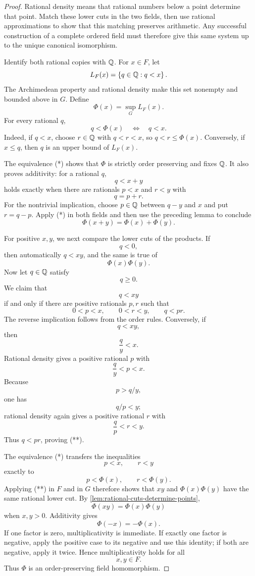 \begin{proof}
Rational density means that rational numbers below a point
determine that point. Match these lower cuts in the two fields, then use
rational approximations to show that this matching preserves arithmetic.
Any successful construction of a complete ordered field must therefore give
this same system up to the unique canonical isomorphism.

Identify both rational copies with \(\mathbb{Q}\).  For \(x\in F\), let
\[
L_F(x)=\left\{q\in\mathbb{Q}:q<x\right\}.
\]
The Archimedean property and rational density make this set nonempty and
bounded above in \(G\).  Define
\[
\Phi(x)=\sup_G L_F(x).
\]
For every rational \(q\),
\[
q<\Phi(x)\quad\Longleftrightarrow\quad q<x.
\tag{*}
\]
Indeed, if \(q<x\), choose \(r\in\mathbb{Q}\) with \(q<r<x\), so
\(q<r\leq\Phi(x)\).  Conversely, if \(x\leq q\), then \(q\) is an upper
bound of \(L_F(x)\).

The equivalence (*) shows that \(\Phi\) is strictly order preserving and
fixes \(\mathbb{Q}\).  It also proves additivity: for a rational \(q\),
\[
q<x+y
\]
holds exactly when there are rationals \(p<x\) and \(r<y\) with
\[
q=p+r.
\]
For the nontrivial implication, choose \(p\in\mathbb{Q}\) between \(q-y\) and \(x\)
and put \(r=q-p\).  Apply (*) in both fields and then use the preceding
lemma to conclude
\[
\Phi(x+y)=\Phi(x)+\Phi(y).
\]

For positive \(x,y\), we next compare the lower cuts of the products.  If
\[
q<0,
\]
then automatically \(q<xy\), and the same is true of
\[
\Phi(x)\Phi(y).
\]
Now let \(q\in\mathbb{Q}\) satisfy
\[
q\geq0.
\]
We claim that
\[
q<xy
\]
if and only if there are positive rationals \(p,r\) such that
\[
0<p<x,\qquad 0<r<y,\qquad q<pr.
\tag{**}
\]
The reverse implication follows from the order rules.  Conversely, if
\[
q<xy,
\]
then
\[
\frac{q}{y}<x.
\]
Rational density gives a positive rational \(p\) with
\[
\frac{q}{y}<p<x.
\]
Because
\[
p>q/y,
\]
 one has
\[
q/p<y;
\]
 rational density again gives a positive
rational \(r\) with
\[
\frac{q}{p}<r<y.
\]
Thus \(q<pr\), proving (**).

The equivalence (*) transfers the inequalities
\[
p<x,\qquad r<y
\]
exactly to
\[
p<\Phi(x),\qquad r<\Phi(y).
\]
Applying (**) in \(F\) and in \(G\) therefore shows that \(xy\) and
\(\Phi(x)\Phi(y)\) have the same rational lower cut.  By
\cref{lem:rational-cuts-determine-points},
\[
\Phi(xy)=\Phi(x)\Phi(y)
\]
when \(x,y>0\).  Additivity gives
\[
\Phi(-x)=-\Phi(x).
\]
If one factor is zero, multiplicativity is immediate.  If exactly one factor
is negative, apply the positive case to its negative and use this identity;
if both are negative, apply it twice.  Hence multiplicativity holds for all
\[
x,y\in F.
\]
Thus \(\Phi\) is an order-preserving field homomorphism.


\end{proof}
